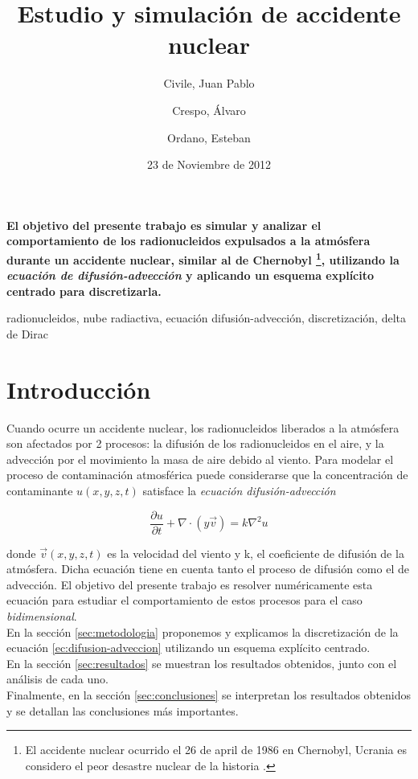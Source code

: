 \documentclass[twocolumn,a4paper,10pt]{article}
\title{Estudio y simulaci\'on de accidente nuclear}
\date{23 de Noviembre de 2012}
\author{Civile, Juan Pablo \and Crespo, Álvaro \and Ordano, Esteban }
\begin{document}
\pagestyle{fancy}
\maketitle
\thispagestyle{fancy}

\begin{customabstract}
\textbf{
El objetivo del presente trabajo es simular y analizar el comportamiento de los radionucleidos expulsados a la atm\'osfera durante un accidente nuclear, similar al 
de Chernobyl \footnote{El accidente nuclear ocurrido el 26 de april de 1986 en Chernobyl, Ucrania es considero el peor desastre nuclear de la historia \cite{Chernobyl}.}, 
utilizando la \textit{ecuaci\'on de difusi\'on-advecci\'on} y aplicando un esquema expl\'icito centrado para discretizarla.
}
\end{customabstract}

\begin{keywords}
radionucleidos, nube radiactiva,  ecuaci\'on difusi\'on-advecci\'on, discretizaci\'on, delta de Dirac
\end{keywords}

\section{Introducci\'on}

Cuando ocurre un accidente nuclear, los radionucleidos liberados a la atm\'osfera son afectados por 2 procesos: la difusi\'on de los radionucleidos en el aire, y
la advecci\'on por el movimiento la masa de aire debido al viento. Para modelar el proceso de contaminaci\'on atmosf\'erica puede considerarse que la concentraci\'on de
contaminante $u(x,y,z,t)$ satisface la \textit{ecuaci\'on difusi\'on-advecci\'on} \cite{Guia2-MNA} \cite{Convection-diffussion equation}

\begin{equation}
\label{ec:difusion-adveccion}
    \frac{\partial u}{\partial t} + \nabla \cdot (y \vec{v}) = k \nabla^2 u
\end{equation}

donde $\vec{v} (x,y,z,t)$ es la velocidad del viento  y k, el coeficiente de difusi\'on de la atm\'osfera. Dicha ecuaci\'on tiene en cuenta tanto el proceso de 
difusi\'on como el de advecci\'on. El objetivo del presente trabajo es resolver num\'ericamente esta ecuaci\'on para estudiar el comportamiento de estos procesos 
para el caso \textit{bidimensional}.\\

En la secci\'on \ref{sec:metodologia} proponemos y explicamos la discretizaci\'on de la ecuaci\'on \ref{ec:difusion-adveccion} utilizando un esquema expl\'icito 
centrado.\\
En la secci\'on \ref{sec:resultados} se muestran los resultados obtenidos, junto con el an\'alisis de cada uno. \\
Finalmente, en la secci\'on \ref{sec:conclusiones} se interpretan los resultados obtenidos y se detallan las conclusiones m\'as importantes. \\
\end{document}
